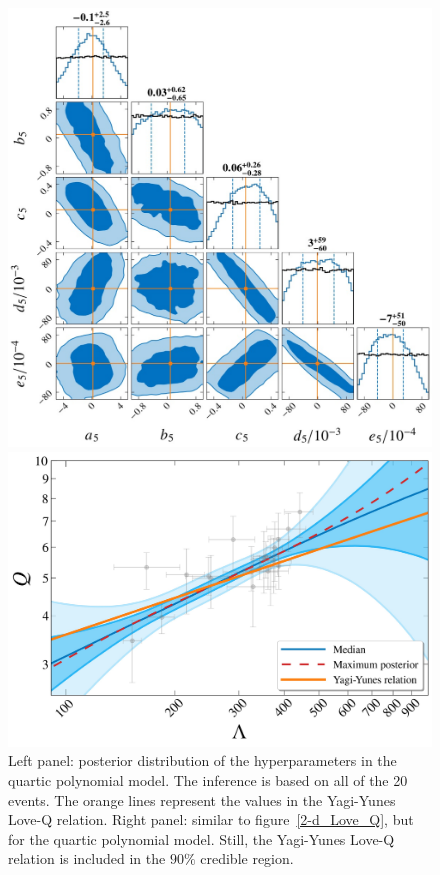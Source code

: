 \documentclass[a4paper,11pt]{article}
\begin{document}
\begin{figure}
\begin{minipage}[t]{0.49\textwidth}
\centering
\includegraphics[width=0.8\linewidth]{Hyper_parameter_5d.pdf}%
\end{minipage}
\hfill
\begin{minipage}[t]{0.49\textwidth}
\includegraphics[width=\linewidth]{hierarchical_results_APR4_5d.pdf}
\end{minipage}
    \caption{\label{5-d_Love_Q} Left panel: posterior distribution of the 
    hyperparameters in the quartic polynomial model. The inference is based on all 
    of the 20 events. The orange lines represent the values in the Yagi-Yunes 
    Love-Q relation. Right panel: similar to figure~\ref{2-d_Love_Q}, but for the 
    quartic polynomial model. Still, the Yagi-Yunes Love-Q relation is included in the $90\%$ credible region.} 
\end{figure}
\end{document}
